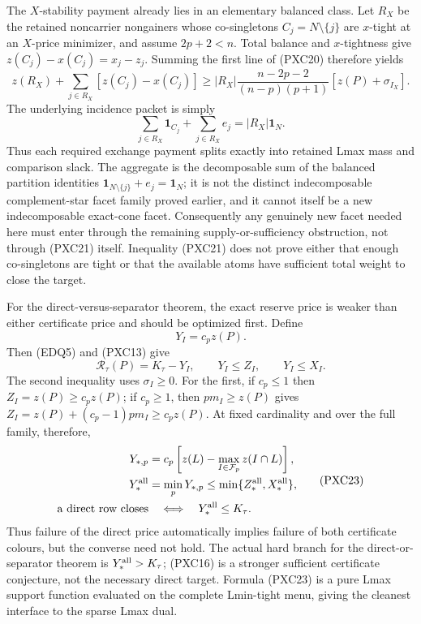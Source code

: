 \documentclass[11pt]{article}
\newcommand{\one}{\mathbf 1}
\begin{document}
The $X$-stability payment already lies in an elementary balanced class.
Let $R_X$ be the retained noncarrier nongainers whose co-singletons
$C_j=N\setminus\{j\}$ are $x$-tight at an $X$-price minimizer, and assume
$2p+2<n$.  Total balance and $x$-tightness give
$z(C_j)-x(C_j)=x_j-z_j$.  Summing the first line of (PXC20) therefore yields
\[
 z(R_X)+\sum_{j\in R_X}[z(C_j)-x(C_j)]
 \ge |R_X|\frac{n-2p-2}{(n-p)(p+1)}
       [z(P)+\sigma_{I_X}].                         \tag{PXC21}
\]
The underlying incidence packet is simply
\[
 \sum_{j\in R_X}\one_{C_j}+\sum_{j\in R_X}e_j
   =|R_X|\one_N.
\]
Thus each required exchange payment splits exactly into retained Lmax mass
and comparison slack.  The aggregate is the decomposable sum of the balanced
partition identities
$\one_{N\setminus\{j\}}+e_j=\one_N$; it is not the distinct indecomposable
complement-star facet family proved earlier, and it cannot itself be a new
indecomposable exact-cone facet.
Consequently any genuinely new facet needed here must enter through the
remaining supply-or-sufficiency obstruction, not through (PXC21) itself.
Inequality (PXC21) does not prove either that enough co-singletons are tight
or that the available atoms have sufficient total weight to close the target.

For the direct-versus-separator theorem, the exact reserve price is weaker
than either certificate price and should be optimized first.  Define
\[
 Y_I=c_pz(P).
\]
Then (EDQ5) and (PXC13) give
\[
 \mathcal R_\tau(P)=K_\tau-Y_I,\qquad
 Y_I\le Z_I,\qquad Y_I\le X_I.                   \tag{PXC22}
\]
The second inequality uses $\sigma_I\ge0$.  For the first, if $c_p\le1$
then $Z_I=z(P)\ge c_pz(P)$; if $c_p\ge1$, then
$pm_I\ge z(P)$ gives
$Z_I=z(P)+(c_p-1)pm_I\ge c_pz(P)$.
At fixed cardinality and over the full family, therefore,
\[
 \begin{split}
 Y_{*,p}&=c_p\left[z(L)-
       \max_{I\in\mathcal F_p}z(I\cap L)\right],\\
 Y_*^{\rm all}&=\min_pY_{*,p}
       \le\min\{Z_*^{\rm all},X_*^{\rm all}\},\\
 \text{a direct row closes}&\quad\Longleftrightarrow\quad
       Y_*^{\rm all}\le K_\tau.
 \end{split}                                       \tag{PXC23}
\]
Thus failure of the direct price automatically implies failure of both
certificate colours, but the converse need not hold.  The actual hard branch
for the direct-or-separator theorem is $Y_*^{\rm all}>K_\tau$; (PXC16) is a
stronger sufficient certificate conjecture, not the necessary direct target.
Formula (PXC23) is a pure Lmax support function evaluated on the complete
Lmin-tight menu, giving the cleanest interface to the sparse Lmax dual.
\end{document}

